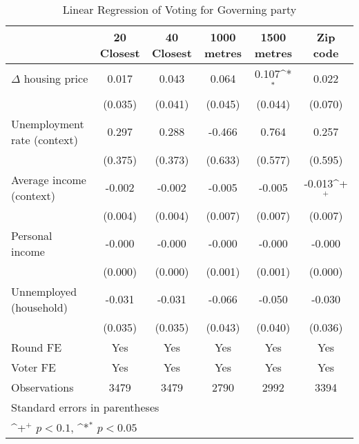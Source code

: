 \begin{table}[htbp]\centering
\def\sym#1{\ifmmode^{#1}\else\(^{#1}\)\fi}
\caption{Linear Regression of Voting for Governing party } \footnotesize \label{inddv}
\begin{tabular}{l*{5}{c}}
\hline\hline
                    &\multicolumn{1}{c}{20 Closest}&\multicolumn{1}{c}{40 Closest}&\multicolumn{1}{c}{1000 metres}&\multicolumn{1}{c}{1500 metres}&\multicolumn{1}{c}{Zip code}\\
\hline
$\Delta$ housing price&       0.017       &       0.043       &       0.064       &       0.107\sym{*}&       0.022       \\
                    &     (0.035)       &     (0.041)       &     (0.045)       &     (0.044)       &     (0.070)       \\
[1em]
Unemployment rate (context)&       0.297       &       0.288       &      -0.466       &       0.764       &       0.257       \\
                    &     (0.375)       &     (0.373)       &     (0.633)       &     (0.577)       &     (0.595)       \\
[1em]
Average income (context)&      -0.002       &      -0.002       &      -0.005       &      -0.005       &      -0.013\sym{+}\\
                    &     (0.004)       &     (0.004)       &     (0.007)       &     (0.007)       &     (0.007)       \\
[1em]
Personal income     &      -0.000       &      -0.000       &      -0.000       &      -0.000       &      -0.000       \\
                    &     (0.000)       &     (0.000)       &     (0.001)       &     (0.001)       &     (0.000)       \\
[1em]
Unnemployed (household)&      -0.031       &      -0.031       &      -0.066       &      -0.050       &      -0.030       \\
                    &     (0.035)       &     (0.035)       &     (0.043)       &     (0.040)       &     (0.036)       \\
[1em]
\hline  Round FE    &         Yes       &         Yes       &         Yes       &         Yes       &         Yes       \\
[1em]
Voter FE            &         Yes       &         Yes       &         Yes       &         Yes       &         Yes       \\
\hline
Observations        &        3479       &        3479       &        2790       &        2992       &        3394       \\
\hline\hline
\multicolumn{6}{l}{\footnotesize Standard errors in parentheses}\\
\multicolumn{6}{l}{\footnotesize \sym{+} \(p<0.1\), \sym{*} \(p<0.05\)}\\
\end{tabular}
\end{table}
